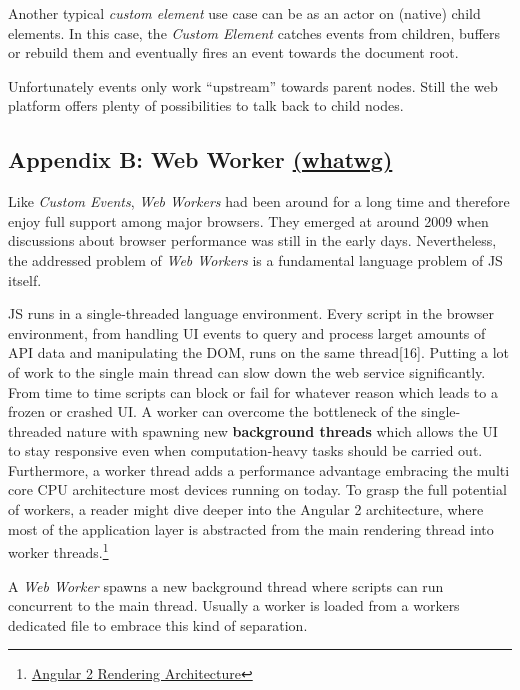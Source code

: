 \documentclass[]{article}
\begin{document}
Another typical \emph{custom element} use case can be as an actor on
(native) child elements. In this case, the \emph{Custom Element} catches
events from children, buffers or rebuild them and eventually fires an
event towards the document root.

Unfortunately events only work ``upstream'' towards parent nodes. Still
the web platform offers plenty of possibilities to talk back to child
nodes.

\subsection{\texorpdfstring{Appendix B: Web Worker
\href{https://html.spec.whatwg.org/multipage/workers.html}{(whatwg)}}{Appendix B: Web Worker (whatwg)}}\label{appendix-b-web-worker-whatwg}

Like \emph{Custom Events}, \emph{Web Workers} had been around for a long
time and therefore enjoy full support among major browsers. They emerged
at around 2009 when discussions about browser performance was still in
the early days. Nevertheless, the addressed problem of \emph{Web
Workers} is a fundamental language problem of JS itself.

JS runs in a single-threaded language environment. Every script in the
browser environment, from handling UI events to query and process larget
amounts of API data and manipulating the DOM, runs on the same
thread{[}16{]}. Putting a lot of work to the single main thread can slow
down the web service significantly. From time to time scripts can block
or fail for whatever reason which leads to a frozen or crashed UI. A
worker can overcome the bottleneck of the single-threaded nature with
spawning new \textbf{background threads} which allows the UI to stay
responsive even when computation-heavy tasks should be carried out.
Furthermore, a worker thread adds a performance advantage embracing the
multi core CPU architecture most devices running on today. To grasp the
full potential of workers, a reader might dive deeper into the Angular 2
architecture, where most of the application layer is abstracted from the
main rendering thread into worker threads.\footnote{\href{https://docs.google.com/document/d/1M9FmT05Q6qpsjgvH1XvCm840yn2eWEg0PMskSQz7k4E}{Angular
  2 Rendering Architecture}}

A \emph{Web Worker} spawns a new background thread where scripts can run
concurrent to the main thread. Usually a worker is loaded from a workers
dedicated file to embrace this kind of separation.
\end{document}
